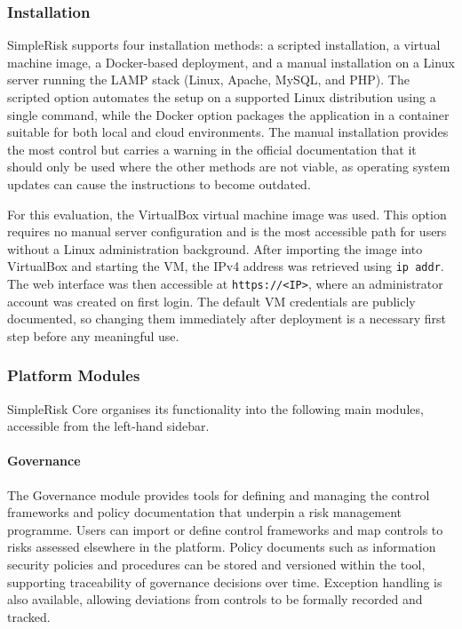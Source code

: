 \subsubsection{Installation}

SimpleRisk supports four installation methods: a scripted installation, a virtual machine
image, a Docker-based deployment, and a manual installation on a Linux server running
the LAMP stack (Linux, Apache, MySQL, and PHP). The scripted option automates the
setup on a supported Linux distribution using a single command, while the Docker option
packages the application in a container suitable for both local and cloud environments.
The manual installation provides the most control but carries a warning in the official
documentation that it should only be used where the other methods are not viable, as
operating system updates can cause the instructions to become outdated.
 
For this evaluation, the VirtualBox virtual machine image was used. This option requires
no manual server configuration and is the most accessible path for users without a Linux
administration background. After importing the image into VirtualBox and starting the
VM, the IPv4 address was retrieved using \texttt{ip addr}. The web interface was then
accessible at \texttt{https://<IP>}, where an administrator account was created on
first login. The default VM credentials are publicly documented, so changing them
immediately after deployment is a necessary first step before any meaningful use.

\subsubsection{Platform Modules}
\label{sec:simplerisk-modules}
SimpleRisk Core organises its functionality into the following main modules, accessible
from the left-hand sidebar.

\paragraph{Governance}
The Governance module provides tools for defining and managing the control frameworks
and policy documentation that underpin a risk management programme. Users can import
or define control frameworks and map controls to risks assessed elsewhere in the platform.
Policy documents such as information security policies and procedures can be stored and
versioned within the tool, supporting traceability of governance decisions over time.
Exception handling is also available, allowing deviations from controls to be formally
recorded and tracked.

